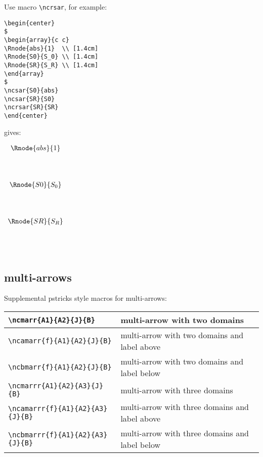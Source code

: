 \documentclass[10pt,a4paper]{article}
\begin{document}
\noindent
Use macro \verb'\ncrsar', for example:
\begin{verbatim}
\begin{center}
$
\begin{array}{c c}
\Rnode{abs}{1}  \\ [1.4cm]
\Rnode{S0}{S_0} \\ [1.4cm]
\Rnode{SR}{S_R} \\ [1.4cm]
\end{array}
$
\ncsar{S0}{abs}
\ncsar{SR}{S0}
\ncrsar{SR}{SR}
\end{center}
\end{verbatim}
gives:

\begin{center}
$
\begin{array}{c c}
\Rnode{abs}{1}  \\ [1.4cm]
\Rnode{S0}{S_0} \\ [1.4cm]
\Rnode{SR}{S_R} \\ [1.4cm]
\end{array}
$
\end{center}


\subsection {multi-arrows}

\noindent Supplemental pstricks style macros for multi-arrows:


		\begin{tabular}{|l |  p{5cm} | }
		   \hline
		   \verb!\ncmarr{A1}{A2}{J}{B}! & multi-arrow with two domains \\
		    \hline
		   \verb!\ncamarr{f}{A1}{A2}{J}{B}! & multi-arrow with two domains and label above \\
		   \hline
		 	 \verb!\ncbmarr{f}{A1}{A2}{J}{B}! & multi-arrow with two domains and label below \\
		 	 \hline
		 	 \verb!\ncmarrr{A1}{A2}{A3}{J}{B}! & multi-arrow with three domains \\
		 	 \hline
		   \verb!\ncamarrr{f}{A1}{A2}{A3}{J}{B}! & multi-arrow with three domains and label above \\
		   \hline
		 	 \verb!\ncbmarrr{f}{A1}{A2}{A3}{J}{B}! & multi-arrow with three domains and label below \\
		 	 \hline
		\end{tabular}
\end{document}

